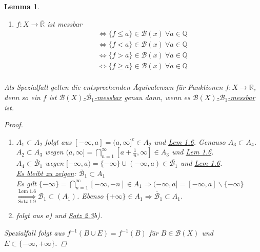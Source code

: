 \documentclass[a4paper]{report}
\newcommand{\R}{\mathbb{R}}
\newcommand{\Rq}{\overline{\R}}
\newcommand{\Q}{\mathbb{Q}}
\newcommand{\Borel}{\mathcal{B}}
\newcommand{\Borelq}{\overline{\Borel}}
\newcommand{\jshortlink}[1]{\jhyperref{#1}{\text{#1}}}
\newcommand{\jhyperref}[2]{\hyperref[j_#1]{#2}}
\newcommand{\jlink}[1]{\jhyperref{#1}{#1}}
\newcommand{\mb}[2]{\jhyperref{messbar}{#1-#2-messbar}}
\newcommand{\jabb}[3]{ #1: #2 \rightarrow #3 }
\theoremstyle{plain}
\newtheorem{lem}[thm]{Lemma}
\theoremstyle{definition}
\begin{document}
{{{\begin{lem}
\begin{enumerate}
        \item $\jabb{f}{X}{\Rq}$ ist messbar
            \begin{displaymath}
                \begin{split}
                    &\Leftrightarrow \{f \le a\} \in \Borel(x) \ \forall a\in \Q\\
                    &\Leftrightarrow \{f < a\} \in \Borel(x) \ \forall a\in \Q\\
                    &\Leftrightarrow \{f > a\} \in \Borel(x) \ \forall a\in \Q\\
                    &\Leftrightarrow \{f \ge a\} \in \Borel(x) \ \forall a\in \Q\\
                \end{split}
            \end{displaymath}
    \end{enumerate}
    Als Spezialfall gelten die entsprechenden Äquivalenzen für Funktionen $\jabb{f}{X}{\R}$, denn so ein $f$ ist \mb{$\Borel(X)$}{$\overline{{\Borel_1}}$} genau dann, wenn es \mb{$\Borel(X)$}{$\Borel_1$} ist.
    \begin{proof}
        \begin{enumerate}
            \item $A_1\subset A_2$ folgt aus $[-\infty, a] = (a,\infty]^c \in A_2$ und \jlink{Lem 1.6}. Genauso $A_3 \subset A_4$.\\
            $A_2 \subset A_3$ wegen $(a,\infty] = \bigcap_{n=1}^\infty [a+\frac{1}{n},\infty] \in A_3$ und \jlink{Lem 1.6}.\\
            $A_4 \subset \Borelq_1$ wegen $[-\infty,a) = \{-\infty\}\cup (-\infty, a) \in \overline{{\Borel_1}}$ und \jlink{Lem 1.6}.\\
            \uline{Es bleibt zu zeigen}: $\Borelq_1 \subset A_1$\\
            Es gilt $\{-\infty\} = \bigcap_{n=1}^\infty [-\infty, -n] \in A_1 \Rightarrow (-\infty,a] = [-\infty,a]\backslash \{-\infty\}$\\
            $\overset{\jshortlink{Lem 1.6}}{\underset{\jshortlink{Satz 1.9}}{\Rightarrow}} \Borel_1 \subset(A_1)$. Ebenso $\{+\infty\} \in A_1 \Rightarrow \Borelq_1 \subset A_1$.
            
            \item folgt aus a) und \jlink{Satz 2.3}b).
        \end{enumerate}
        Spezialfall folgt aus $f^{-1}(B\cup E) = f^{-1}(B)$ für $B\in \Borel(X)$ und $E \subset \{-\infty, +\infty\}$.
    \end{proof}
\end{lem}

}}}
\end{document}
